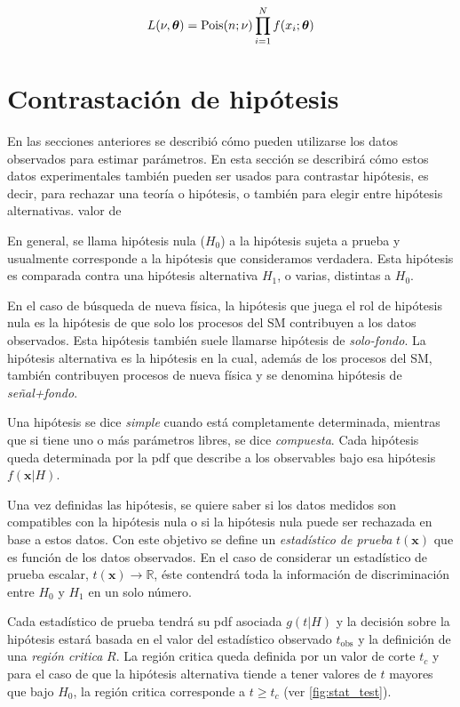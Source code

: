 \begin{equation}
  L(\nu,\bm{\theta}) = \operatorname{Pois}(n;\nu) \prod_{i=1}^{N} f(x_i; \bm{\theta})
  \label{eq:likelihood_ext}
\end{equation}


\section{Contrastación de hipótesis}
\label{sec:testhypo}

En las secciones anteriores se describió cómo pueden utilizarse los datos
observados para estimar parámetros. En esta sección se describirá cómo estos
datos experimentales también pueden ser usados para contrastar hipótesis, es
decir, para rechazar una teoría o hipótesis, o también para elegir
entre hipótesis alternativas. %
valor de

En general, se llama hipótesis nula ($H_0$) a la hipótesis sujeta a prueba y
usualmente corresponde a la hipótesis que consideramos verdadera. Esta hipótesis
es comparada contra una hipótesis alternativa $H_1$, o varias, distintas a $H_0$.

En el caso de búsqueda de nueva física, la hipótesis que juega el rol de
hipótesis nula es la hipótesis de que solo los procesos del SM contribuyen a los
datos observados. Esta hipótesis también suele llamarse hipótesis de
\emph{solo-fondo}. La hipótesis alternativa es la hipótesis en la cual, además
de los procesos del SM, también contribuyen procesos de nueva física y se
denomina hipótesis de \emph{se\~nal+fondo}.

Una hipótesis se dice \emph{simple} cuando está completamente determinada, mientras que si
tiene uno o más parámetros libres, se dice \emph{compuesta}. Cada
hipótesis queda determinada por la pdf que describe a los observables bajo esa
hipótesis $f(\bm{x}|H)$.

Una vez definidas las hipótesis, se quiere saber si los datos medidos son
compatibles con la hipótesis nula o si la hipótesis nula puede ser rechazada en
base a estos datos. Con este objetivo se define un \emph{estadístico de prueba}
$t(\bm{x})$ que es función de los datos observados. En el caso de considerar un
estadístico de prueba escalar, $t(\bm{x}) \to \mathbb{R}$, éste contendrá toda la
información de discriminación entre $H_0$ y $H_1$ en un solo número.

Cada estadístico de prueba tendrá su pdf asociada $g(t|H)$ y la decisión sobre
la hipótesis estará basada en el valor del estadístico observado $t_\text{obs}$
y la definición de una \emph{región critica} $R$. La región critica queda
definida por un valor de corte $t_c$ y para el caso de que la hipótesis
alternativa tiende a tener valores de $t$ mayores que bajo $H_0$, la región
critica corresponde a $t \geq t_c$ (ver \cref{fig:stat_test}).


